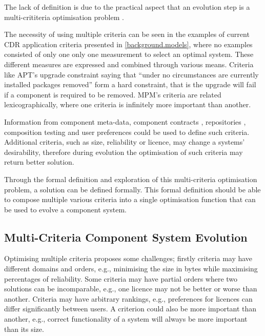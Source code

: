 The lack of definition is due to the practical aspect that an evolution step is a multi-crititeria optimisation problem \cite{leBerre2010}. 

The necessity of using multiple criteria can be seen in the examples of current CDR application criteria presented in \ref{background.models},
where no examples consisted of only one only one measurement to select an optimal system.
These different measures are expressed and combined through various means.
Criteria like APT's upgrade constraint saying that ``under no circumstances are currently installed packages removed'' form a hard constraint,
that is the upgrade will fail if a component is required to be removed.
MPM's criteria are related lexicographically, where one criteria is infinitely more important than another.

Information from component meta-data, component contracts \cite{Watkins1999}, repositories \cite{Guo2000}, 
composition testing \cite{XuejieZhang2008} and user preferences could be used to define such criteria.
Additional criteria, such as size, reliability or licence, may change a systems' desirability, 
therefore during evolution the optimisation of such criteria may return better solution.

Through the formal definition and exploration of this multi-criteria optimisation problem,
a solution can be defined formally.
This formal definition should be able to compose multiple various criteria into a single optimisation function that can be used to evolve a component system.

\subsection{Multi-Criteria Component System Evolution}
Optimising multiple criteria proposes some challenges; firstly criteria may have different domains and orders, 
e.g., minimising the size in bytes while maximising percentages of reliability. 
Some criteria may have partial orders where two solutions can be incomparable,
e.g., one licence may not be better or worse than another.
Criteria may have arbitrary rankings, 
e.g., preferences for licences can differ significantly between users.
A criterion could also be more important than another, 
e.g., correct functionality of a system will always be more important than its size.


